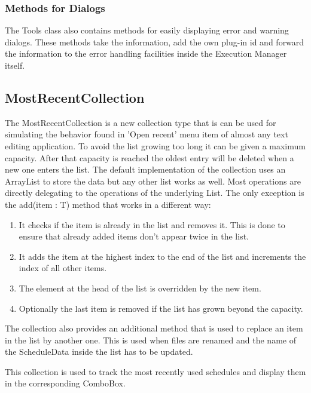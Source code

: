 \subsubsection{Methods for Dialogs}
\label{section:ToolsMethodsDialogs}
The Tools class also contains methods for easily displaying error and warning dialogs.
These methods take the information, add the own plug-in id and forward the information to the 
error handling facilities inside the Execution Manager itself.


\subsection{MostRecentCollection}
\label{section:MostRecentCollection}
The MostRecentCollection is a new collection type that is can be used for simulating the 
behavior found in 'Open recent' menu item of almost any text editing application.
To avoid the list growing too long it can be given a maximum capacity. After that capacity
is reached the oldest entry will be deleted when a new one enters the list.
The default implementation of the collection uses an ArrayList to store the data but any
other list works as well. Most operations are directly delegating to the operations of the 
underlying List. 
The only exception is the add(item : T) method that works in a different way:
\begin{enumerate}
 \item It checks if the item is already in the list and removes it. This is done to ensure
that already added items don't appear twice in the list.
 \item It adds the item at the highest index to the end of the list and increments the index of all other items.
 \item The element at the head of the list is overridden by the new item.
 \item Optionally the last item is removed if the list has grown beyond the capacity.
\end{enumerate}
The collection also provides an additional method that is used to replace an item in
the list by another one. This is used when files are renamed and the name of the ScheduleData inside
the list has to be updated.

This collection is used to track the most recently used schedules and display them
in the corresponding ComboBox.



